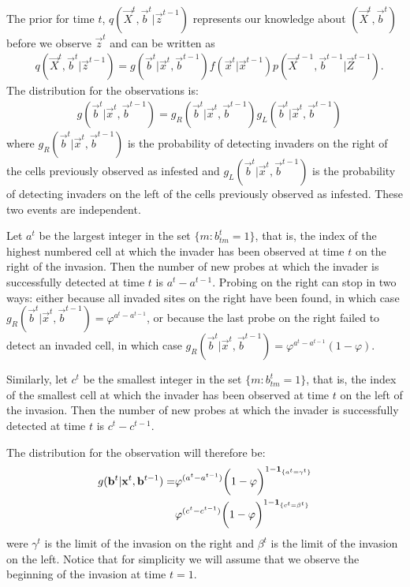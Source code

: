The prior for time $t$, $q(\vec{X}^{t}, \vec{b}^t | \vec{z}^{t-1})$ represents our knowledge about $(\vec{X}^{t}, \vec{b}^t)$ before we observe $\vec{z}^{t}$ and can be written as
\begin{align}
    & q(\vec{X}^{t}, \vec{b}^{t} | \vec{z}^{t-1}) = g(\vec{b}^{t} | \vec{x}^{t}, \vec{b}^{t-1}) f(\vec{x}^{t} | \vec{x}^{t-1}) p(\vec{X}^{t-1}, \vec{b}^{t-1} | \vec{Z}^{t-1}). \label{eq:3}
\end{align}
The distribution for the observations is:
\begin{align*}
    & g(\vec{b}^{t} | \vec{x}^{t}, \vec{b}^{t-1}) = g_R(\vec{b}^{t} | \vec{x}^{t}, \vec{b}^{t-1}) g_L(\vec{b}^{t} | \vec{x}^{t}, \vec{b}^{t-1})
\end{align*}
where $g_R(\vec{b}^{t} | \vec{x}^{t}, \vec{b}^{t-1})$ is the probability of detecting invaders on the right of the cells previously observed as infested and $g_L(\vec{b}^{t} | \vec{x}^{t}, \vec{b}^{t-1})$ is the probability of detecting invaders on the left of the cells previously observed as infested. These two events are independent.

Let $a^{t}$ be the largest integer in the set $\{ m : b_{tm}^{t} = 1 \}$, that is, the index of the highest numbered cell at which the invader has been observed at time $t$ on the right of the invasion. Then the number of new probes at which the invader is successfully detected at time $t$ is $a^{t} - a^{t-1}$. Probing on the right can stop in two ways: either because all invaded sites on the right have been found, in which case $g_R(\vec{b}^{t} | \vec{x}^{t}, \vec{b}^{t-1}) = \varphi^{a^{t} - a^{t-1}}$, or because the last probe on the right failed to detect an invaded cell, in which case $g_R(\vec{b}^{t} | \vec{x}^{t}, \vec{b}^{t-1}) = \varphi^{a^{t} - a^{t-1}} (1 - \varphi)$.

Similarly, let $c^{t}$ be the smallest integer in the set $\{ m : b_{tm}^{t} = 1 \}$, that is, the index of the smallest cell at which the invader has been observed at time $t$ on the left of the invasion. Then the number of new probes at which the invader is successfully detected at time $t$ is $c^{t} - c^{t-1}$.

The distribution for the observation will therefore be:
\begin{align*}
    g(\mathbf{b}^{t} | \mathbf{x}^{t}, \mathbf{b}^{t-1}) = &\varphi^{(a^{t} - a^{t-1})} \bigg(1 - \varphi \bigg)^{1-\mathbf{1}_{\{a^{t}=\gamma^{t}\}}}\\
    &\varphi^{(c^{t} - c^{t-1})} \bigg( 1 - \varphi \bigg)^{1-\mathbf{1}_{\{c^{t}=\beta^{t}\}}}
\end{align*}
were $\gamma^{t}$ is the limit of the invasion on the right and $\beta^{t}$ is the limit of the invasion on the left. Notice that for simplicity we will assume that we observe the beginning of the invasion at time $t=1$. 

